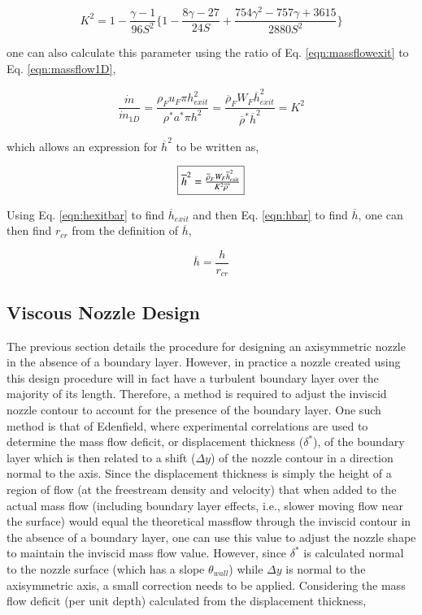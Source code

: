 \begin{displaymath}
	K^2 = 1 - \frac{\gamma-1}{96S^2}\Big\{1 - \frac{8\gamma -27}{24S} + 
	\frac{754\gamma^2 -757\gamma+3615}{2880S^2}\Big\}
\end{displaymath}

	one can also calculate this parameter using the ratio of Eq. \ref{eqn:massflowexit} 
to Eq. \ref{eqn:massflow1D},

\begin{displaymath}
	\frac{\dot{m}}{\dot{m}_{1D}}=\frac{\rho_F u_F \pi h_{exit}^2}{\rho^* a^* \pi h^2}=
	\frac{\overline{\rho}_F W_F \overline{h}_{exit}^2}{\overline{\rho}^*\overline{h}^2}=K^2
\end{displaymath}

	which allows an expression for $\overline{h}^2$ to be written as,

\begin{equation}
	\fbox{$
	\overline{h}^2 = \frac{\overline{\rho}_F W_F \overline{h}_{exit}^2}{K^2 \overline{\rho}^*}
	$}
\label{eqn:hbar}
\end{equation}	

	Using Eq. \ref{eqn:hexitbar} to find $\overline{h}_{exit}$ and then Eq. \ref{eqn:hbar} to find
$\overline{h}$, one can then find $r_{cr}$ from the definition of $\overline{h}$,

\begin{equation}
	\overline{h}=\frac{h}{r_{cr}}
\label{eqn:rcr}
\end{equation}

\subsection{Viscous Nozzle Design}

	The previous section details the procedure for designing an axisymmetric nozzle 
in the absence of a boundary layer.  However,
in practice a nozzle created using this design procedure will in fact have a turbulent
boundary layer over the majority of its length.  Therefore, a method is required to adjust the
inviscid nozzle contour to account for the presence of the boundary layer.  One such method
is that of Edenfield, where experimental correlations are used to determine the mass flow deficit, or 
displacement thickness ($\delta^*$), of the boundary layer which is then related to a shift ($\Delta y$) of
the nozzle contour in a direction normal to the axis.  Since the displacement thickness is simply the 
height of a region of flow (at the freestream density and velocity) that when added to the actual mass
flow (including boundary layer effects, i.e., slower moving flow near the surface) would equal the 
theoretical massflow through the inviscid contour in the absence of a boundary layer, one can use this value 
to adjust the nozzle shape to maintain the inviscid mass flow value.  However, since $\delta^*$ is 
calculated normal to the nozzle surface 
(which has a slope $\theta_{wall}$) while $\Delta y$ is normal to the axisymmetric axis, a small
correction needs to be applied.  Considering the mass flow deficit (per unit depth) calculated from the
displacement thickness,

